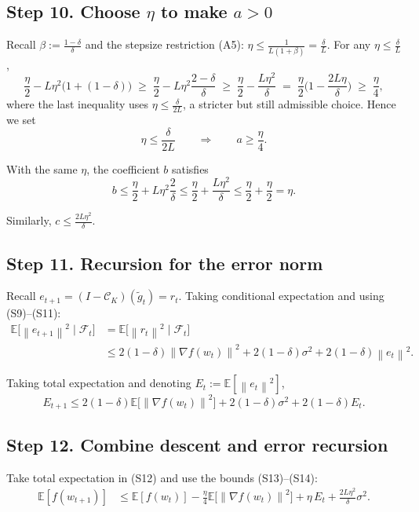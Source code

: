 \documentclass{article}
\newcommand{\E}{\mathbb{E}}
\newcommand{\norm}[1]{\left\|#1\right\|}
\newcommand{\topk}{\mathcal{C}_K}
\begin{document}
\subsection*{Step 10. Choose $\eta$ to make $a>0$}
Recall $\beta:=\frac{1-\delta}{\delta}$ and the stepsize restriction (A5):
$\eta\le \frac{1}{L(1+\beta)} = \frac{\delta}{L}$.
For any $\eta\le\frac{\delta}{L}$,
\[
\frac{\eta}{2}-L\eta^{2}\big(1+(1-\delta)\big)
\;\ge\;
\frac{\eta}{2}-L\eta^{2}\frac{2-\delta}{\delta}
\;\ge\;
\frac{\eta}{2}-\frac{L\eta^{2}}{\delta}
\;=\;\frac{\eta}{2}\Big(1-\frac{2L\eta}{\delta}\Big)
\;\ge\;\frac{\eta}{4},
\]
where the last inequality uses $\eta\le \frac{\delta}{2L}$, a stricter but
still admissible choice. Hence we set
\[
\boxed{\eta\le \frac{\delta}{2L}} \qquad\Longrightarrow\qquad a\ge\frac{\eta}{4}.
\tag{S13}
\]

With the same $\eta$, the coefficient $b$ satisfies
\[
b \le \frac{\eta}{2}+L\eta^{2}\frac{2}{\delta}
    \le \frac{\eta}{2}+ \frac{L\eta^{2}}{\delta}
    \le \frac{\eta}{2}+ \frac{\eta}{2}
    =\eta .
\tag{S14}
\]

Similarly, $c\le \frac{2L\eta^{2}}{\delta}$.

\subsection*{Step 11. Recursion for the error norm}
Recall $e_{t+1}= (I-\topk)(\tilde g_t)=r_t$.
Taking conditional expectation and using (S9)–(S11):
\[
\begin{aligned}
\E\!\big[\norm{e_{t+1}}^{2}\mid\mathcal{F}_t\big]
&= \E\!\big[\norm{r_t}^{2}\mid\mathcal{F}_t\big] \\
&\le 2(1-\delta)\norm{\nabla f(w_t)}^{2}
   +2(1-\delta)\sigma^{2}
   +2(1-\delta)\norm{e_t}^{2}.
\end{aligned}
\tag{S15}
\]

Taking total expectation and denoting $E_t:=\E[\norm{e_t}^{2}]$,
\[
E_{t+1}\le 2(1-\delta) \E\!\big[\norm{\nabla f(w_t)}^{2}\big]
          +2(1-\delta)\sigma^{2}
          +2(1-\delta)E_t .
\tag{S16}
\]

\subsection*{Step 12. Combine descent and error recursion}
Take total expectation in (S12) and use the bounds (S13)–(S14):
\[
\begin{aligned}
\E[f(w_{t+1})]
&\le \E[f(w_t)]
   -\frac{\eta}{4}\E\!\big[\norm{\nabla f(w_t)}^{2}\big]
   +\eta\,E_t
   +\frac{2L\eta^{2}}{\delta}\sigma^{2}.
\end{aligned}
\tag{S17}
\]
\end{document}

